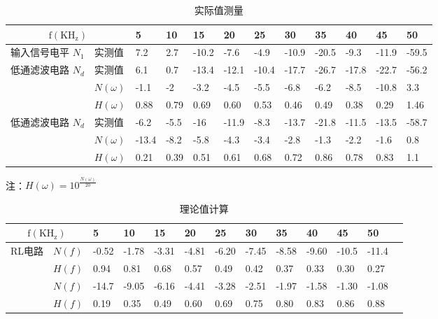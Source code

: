 \documentclass[dvipsnames, svgnames,a4paper,11pt]{article}
\begin{document}
\begin{table}[H]
  \renewcommand\arraystretch{1.7}
  \centering
  \caption{实际值测量}
  \begin{tabularx}{\textwidth}{|p{}|X|X|X|X|X|X|X|X|X|X|X|}
    \hline
    \multicolumn{2}{|c|}{$\mathrm{f(KH_z)}$} & 5 & 10 & 15 & 20 & 25 & 30 & 35 & 40 & 45 & 50 \\
    \hline
    输入信号电平 $N_1$ & 实测值 & 7.2 & 2.7 & -10.2 & -7.6 & -4.9 & -10.9 & -20.5 & -9.3 & -11.9 & -59.5 \\
    \hline
    \multirow{3}{*}{低通滤波电路 $N_d$} & 实测值 & 6.1 & 0.7 & -13.4 & -12.1 & -10.4 & -17.7 & -26.7 & -17.8 & -22.7 & -56.2 \\
    \cline{2-12}
     & $N(\omega)$ & -1.1 & -2 & -3.2 & -4.5 & -5.5 & -6.8 & -6.2 & -8.5 & -10.8 & 3.3 \\
     \cline{2-12}
     & $H(\omega)$ & 0.88 &	0.79 & 0.69 &	0.60 & 0.53 &	0.46 & 0.49 &	0.38 & 0.29 &	1.46  \\
    \hline
    \multirow{3}{*}{低通滤波电路 $N_d$} & 实测值 & -6.2 & -5.5 & -16 & -11.9 & -8.3 & -13.7 & -21.8 & -11.5 & -13.5 & -58.7 \\
    \cline{2-12}
    & $N(\omega)$ & -13.4 &	-8.2 & -5.8 & -4.3 & -3.4	& -2.8 & -1.3 & -2.2 & -1.6 & 0.8
    \\
    \cline{2-12}
    & $H(\omega)$ & 0.21 & 0.39 & 0.51 & 0.61 &	0.68 & 0.72 &	0.86 & 0.78 &	0.83 & 1.1
    \\
    \hline
  \end{tabularx}
\end{table}
注：$H(\omega) = 10^{\frac{N(\omega)}{20}}$

\begin{table}[H]
  \renewcommand\arraystretch{1.7}
  \centering
  \caption{理论值计算}
  \begin{tabularx}{\textwidth}{|p{}|X|X|X|X|X|X|X|X|X|X|X|X|}
    \hline
    \multicolumn{2}{|c|}{$\mathrm{f(KH_z)}$} & 5 & 10 & 15 & 20 & 25 & 30 & 35 & 40 & 45 & 50 \\
    \hline
    \multirow{3}{*}{RL电路} & $N(f)$ & -0.52 & -1.78 & -3.31 & -4.81 & -6.20 & -7.45 & -8.58 & -9.60 & -10.5 & -11.4
    \\
    \cline{2-12}
     &$H(f)$ & 0.94 & 0.81 &	0.68 & 0.57	& 0.49 & 0.42 &	0.37 & 0.33 & 0.30 & 0.27
    \\
    \hline
    \multirow{3}{*}{RC电路} & $N(f)$ & -14.7 & -9.05 &	-6.16 & -4.41 &	-3.28 &	-2.51 & -1.97 & -1.58 &	-1.30 & -1.08
    \\
    \cline{2-12}
     & $H(f)$ & 0.19 & 0.35	& 0.49 & 0.60 &	0.69 & 0.75 &	0.80 & 0.83 &	0.86 & 0.88
    \\
    \hline
  \end{tabularx}
\end{table}
\end{document}

